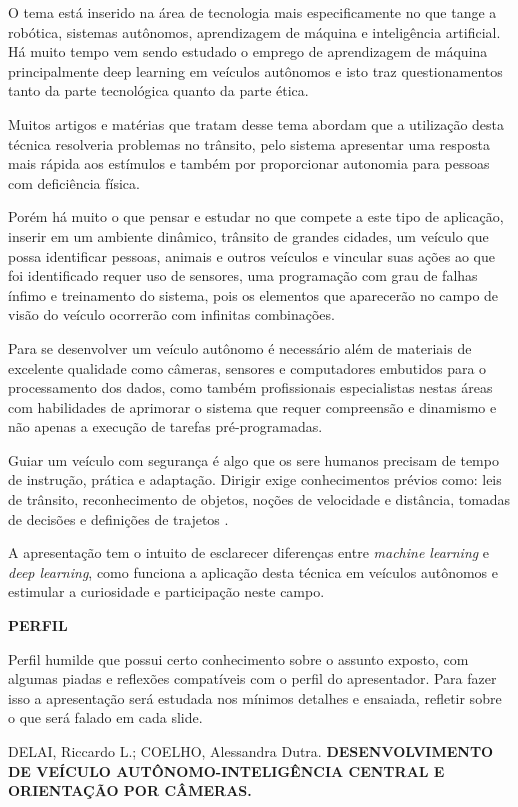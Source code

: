 \documentclass[12pt,a4paper]{article}
\begin{document}
    \par O tema está inserido na área de tecnologia mais especificamente no que tange a robótica, sistemas autônomos, aprendizagem de máquina e inteligência artificial. Há muito tempo vem sendo estudado o emprego de aprendizagem de máquina principalmente deep learning em veículos autônomos e isto traz questionamentos tanto da parte tecnológica quanto da parte ética.
    \par Muitos artigos e matérias que tratam desse tema abordam que a utilização desta técnica resolveria problemas no trânsito, pelo sistema apresentar uma resposta mais rápida aos estímulos e também por proporcionar autonomia para pessoas com deficiência física.
    \par Porém há muito o que pensar e estudar no que compete a este tipo de aplicação, inserir em um ambiente dinâmico, trânsito de grandes cidades, um veículo que possa identificar pessoas, animais e outros veículos e vincular suas ações ao que foi identificado requer uso de sensores, uma programação com grau de falhas ínfimo e treinamento do sistema, pois os elementos que aparecerão no campo de visão do veículo ocorrerão com infinitas combinações.
    \par Para se desenvolver um veículo autônomo é necessário além de materiais de excelente qualidade como câmeras, sensores e computadores embutidos para o processamento dos dados, como também profissionais especialistas nestas áreas com habilidades de aprimorar o sistema que requer compreensão e dinamismo e não apenas a execução de tarefas pré-programadas.
    \par Guiar um veículo com segurança é algo que os sere humanos precisam de tempo de instrução, prática e adaptação. Dirigir exige conhecimentos prévios como: leis de trânsito, reconhecimento de objetos, noções de velocidade e distância, tomadas de decisões e definições de trajetos \cite{1}.
    \par A apresentação tem o intuito de esclarecer diferenças entre \textit{machine learning} e \textit{deep learning}, como funciona a aplicação desta técnica em veículos autônomos e estimular a curiosidade e participação neste campo.

    \textbf{PERFIL}
    \par Perfil humilde que possui certo conhecimento sobre o assunto exposto, com algumas piadas e reflexões compatíveis com o perfil do apresentador. Para fazer isso a apresentação será estudada nos mínimos detalhes e ensaiada, refletir sobre o que será falado em cada slide.


     
    \begin{thebibliography}{BIBLIOGRAFIA}
 
         DELAI, Riccardo L.; COELHO, Alessandra Dutra. \textbf{DESENVOLVIMENTO DE VEÍCULO AUTÔNOMO-INTELIGÊNCIA CENTRAL E ORIENTAÇÃO POR CÂMERAS.}
    
    \end{thebibliography}
\end{document}
